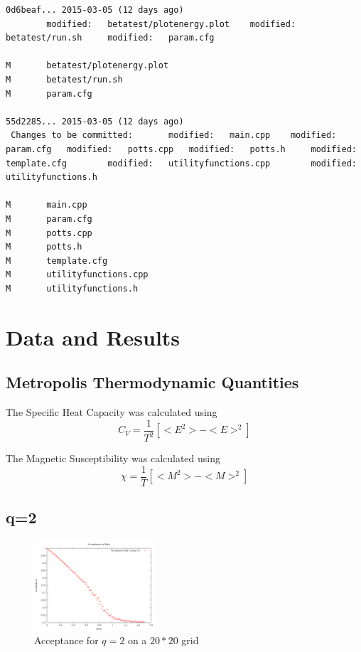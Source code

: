 \documentclass[12pt,a4paper,notitlepage,twoside]{article}
\begin{document}
\begin{lstlisting}[breaklines]
0d6beaf... 2015-03-05 (12 days ago)
        modified:   betatest/plotenergy.plot    modified:   betatest/run.sh     modified:   param.cfg

M       betatest/plotenergy.plot
M       betatest/run.sh
M       param.cfg

55d2285... 2015-03-05 (12 days ago)
 Changes to be committed:       modified:   main.cpp    modified:   param.cfg   modified:   potts.cpp   modified:   potts.h     modified:   template.cfg        modified:   utilityfunctions.cpp        modified:   utilityfunctions.h

M       main.cpp
M       param.cfg
M       potts.cpp
M       potts.h
M       template.cfg
M       utilityfunctions.cpp
M       utilityfunctions.h

\end{lstlisting}

\section{Data and Results}
\subsection{Metropolis Thermodynamic Quantities}

The Specific Heat Capacity was calculated using
\begin{equation}
C_V = \frac{1}{T^2} \left[ <E^2> - <E>^2 \right]
\end{equation}

The Magnetic Susceptibility was calculated using
\begin{equation}
\chi = \frac{1}{T} \left[ <M^2> - <M>^2 \right]
\end{equation}

\subsection{q=2}
\begin{figure}[H]
\centering
\includegraphics[width=0.4\textwidth]{q2d20/acceptance.png}
\caption{Acceptance for $q=2$ on a $20*20$ grid}
\end{figure}
\end{document}
